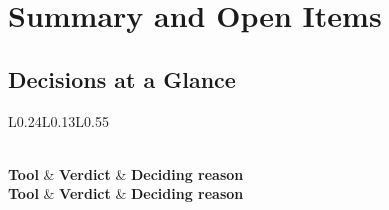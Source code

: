\chapter{Summary and Open Items}
\label{ch:summary}

\section{Decisions at a Glance}

\begin{longtable}{L{0.24\textwidth}L{0.13\textwidth}L{0.55\textwidth}}
	\caption{Tool decisions}\label{tab:summary}\\
	\toprule
	\textbf{Tool} & \textbf{Verdict} & \textbf{Deciding reason} \\
	\midrule
	\endfirsthead
	\toprule
	\textbf{Tool} & \textbf{Verdict} & \textbf{Deciding reason} \\
	\midrule
	\endhead


\end{longtable}
